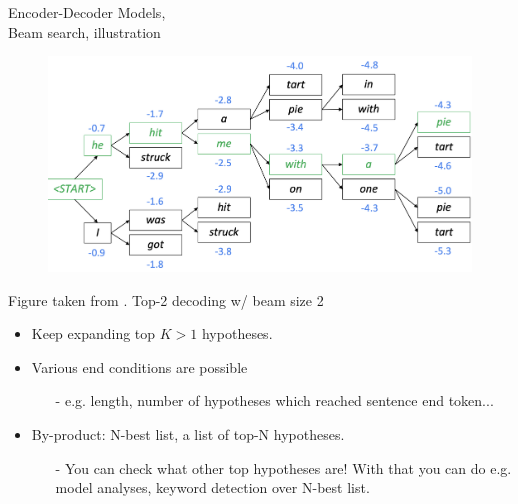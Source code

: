 \begin{frame}{Encoder-Decoder Models,\\ Beam search, illustration}
\begin{figure}
  \begin{center}
    \includegraphics[height=0.6\textheight]{figures/beam-search.png}
  \end{center}
\vspace{-3mm}
\end{figure}
{\scriptsize Figure taken from \cite{stanford2019nlp}. Top-2 decoding w/ beam size 2}
\begin{itemize}
\item Keep expanding top $K>1$ hypotheses.
\item Various end conditions are possible
\begin{itemize}
\item[-] e.g. length, number of hypotheses which reached sentence end token...
\end{itemize}
\item By-product: N-best list, a list of top-N hypotheses.
\begin{itemize}
\item[-] You can check what other top hypotheses are! With that you can do e.g. model analyses, keyword detection over N-best list.
\end{itemize}
\end{itemize}
\end{frame}

%

